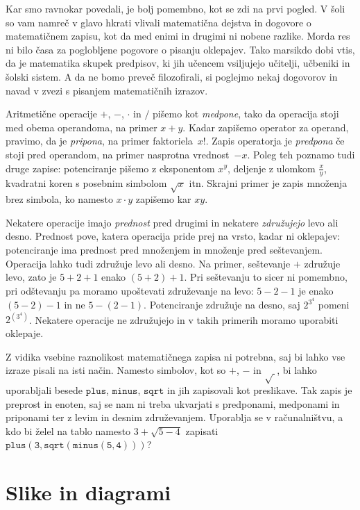 Kar smo ravnokar povedali, je bolj pomembno, kot se zdi na prvi pogled. V šoli so vam
namreč v glavo hkrati vlivali matematična dejstva in dogovore o matematičnem zapisu, kot
da med enimi in drugimi ni nobene razlike. Morda res ni bilo časa za poglobljene pogovore
o pisanju oklepajev. Tako marsikdo dobi vtis, da je matematika skupek predpisov, ki jih
učencem vsiljujejo učitelji, učbeniki in šolski sistem. A da ne bomo preveč filozofirali,
si poglejmo nekaj dogovorov in navad v zvezi s pisanjem matematičnih izrazov.

Aritmetične operacije $+$, $-$, $\cdot$ in $/$ pišemo kot \emph{medpone}, tako da operacija
stoji med obema operandoma, na primer $x + y$. Kadar zapišemo operator za operand,
pravimo, da je \emph{pripona}, na primer faktoriela~$x!$. Zapis operatorja je
\emph{predpona} če stoji pred operandom, na primer nasprotna vrednost~$-x$. Poleg teh
poznamo tudi druge zapise: potenciranje pišemo z eksponentom $x^y$, deljenje z ulomkom
$\frac{x}{y}$, kvadratni koren s posebnim simbolom $\sqrt{x}$ itn. Skrajni primer je zapis
množenja brez simbola, ko namesto $x \cdot y$ zapišemo kar $x y$.

Nekatere operacije imajo \emph{prednost} pred drugimi in nekatere \emph{združujejo} levo
ali desno. Prednost pove, katera operacija pride prej na vrsto, kadar ni oklepajev:
potenciranje ima prednost pred množenjem in množenje pred seštevanjem. Operacija lahko
tudi združuje levo ali desno. Na primer, seštevanje $+$ združuje levo, zato je $5 + 2 + 1$
enako $(5 + 2) + 1$. Pri seštevanju to sicer ni pomembno, pri odštevanju pa moramo
upoštevati združevanje na levo: $5 - 2 - 1$ je enako $(5 - 2) - 1$ in ne $5 - (2 - 1)$.
Potenciranje združuje na desno, saj $2^{3^4}$ pomeni $2^{(3^4)}$. Nekatere operacije ne
združujejo in v takih primerih moramo uporabiti oklepaje.

Z vidika vsebine raznolikost matematičnega zapisa ni potrebna, saj bi lahko vse izraze
pisali na isti način. Namesto simbolov, kot so $+$, $-$ in $\sqrt{\ }$, bi lahko
uporabljali besede $\mathtt{plus}$, $\mathtt{minus}$, $\mathtt{sqrt}$ in jih zapisovali
kot preslikave. Tak zapis je preprost in enoten, saj se nam ni treba ukvarjati s
predponami, medponami in priponami ter z levim in desnim združevanjem. Uporablja se v
računalništvu, a kdo bi želel na tablo namesto $3 + \sqrt{5 - 4}$ zapisati
$\mathtt{plus(3, \mathtt{sqrt}(\mathtt{minus}(5, 4)))}$?



\section{Slike in diagrami}
\label{sec:slike-in-diagrami}


